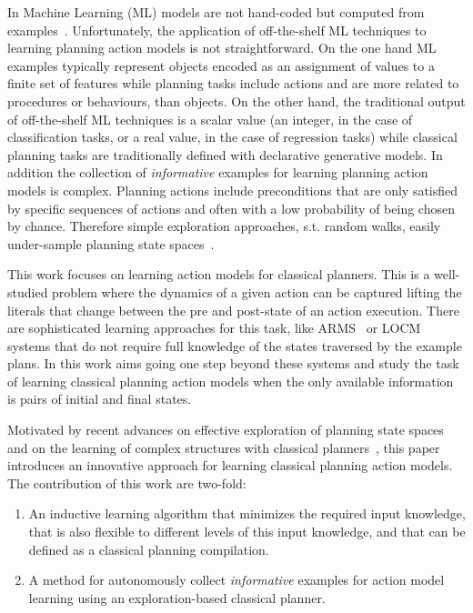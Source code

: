 \documentclass[letterpaper]{article} %
\begin{document}
In Machine Learning (ML) models are not hand-coded but computed from examples~\cite{michalski2013machine}. Unfortunately, the application of off-the-shelf ML techniques to learning planning action models is not straightforward. On the one hand ML examples typically represent objects encoded as an assignment of values to a finite set of features while planning tasks include actions and are more related to procedures or behaviours, than objects. On the other hand, the traditional output of off-the-shelf ML techniques is a scalar value (an integer, in the case of classification tasks, or a real value, in the case of regression tasks) while classical planning tasks are traditionally defined with declarative generative models. In addition the collection of {\em informative} examples for learning planning action models is complex. Planning actions include preconditions that are only satisfied by specific sequences of actions and often with a low probability of being chosen by chance. Therefore simple exploration approaches, s.t. random walks, easily under-sample planning state spaces~\cite{fern2004learning}.

This work focuses on learning action models for classical planners. This is a well-studied problem where the dynamics of a given action can be captured lifting the literals that change between the pre and post-state of an action execution. There are sophisticated learning approaches for this task, like ARMS~\cite{yang2007learning} or LOCM~\cite{cresswell2013acquiring} systems that do not require full knowledge of the states traversed by the example plans. In this work aims going one step beyond these systems and study the task of learning classical planning action models when the only available information is pairs of initial and final states.

Motivated by recent advances on effective exploration of planning state spaces~\cite{} and on the learning of complex structures with classical planners~\cite{segovia2017unsupervised}, this paper introduces an innovative approach for learning classical planning action models. The contribution of this work are two-fold:
\begin{enumerate}
\item An inductive learning algorithm that minimizes the required input knowledge, that is also flexible to different levels of this input knowledge, and that can be defined as a classical planning compilation. 
\item A method for autonomously collect {\em informative} examples for action model learning using an exploration-based classical planner.
\end{enumerate}
\end{document}
